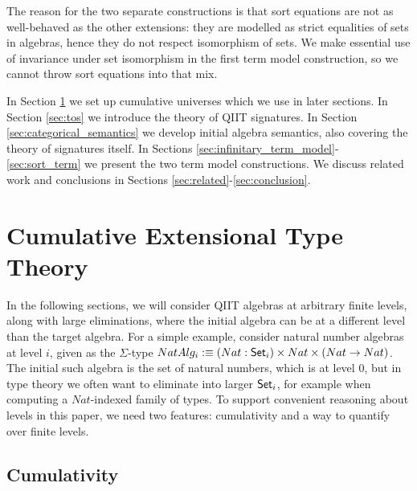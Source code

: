 \documentclass{llncs}
\begin{document}
The reason for the two separate constructions is that sort equations are not as
well-behaved as the other extensions: they are modelled as strict equalities of
sets in algebras, hence they do not respect isomorphism of sets. We make
essential use of invariance under set isomorphism in the first term model
construction, so we cannot throw sort equations into that mix.

In Section \ref{sec:levels} we set up cumulative universes which we use in later
sections. In Section \ref{sec:tos} we introduce the theory of QIIT
signatures. In Section \ref{sec:categorical_semantics} we develop initial algebra semantics,
also covering the theory of signatures itself. In Sections
\ref{sec:infinitary_term_model}-\ref{sec:sort_term} we present the two term model
constructions. We discuss related work and conclusions in Sections
\ref{sec:related}-\ref{sec:conclusion}.


\section{Cumulative Extensional Type Theory}
\label{sec:levels}

In the following sections, we will consider QIIT algebras at arbitrary finite
levels, along with large eliminations, where the initial algebra can be at a
different level than the target algebra. For a simple example, consider natural
number algebras at level $i$, given as the $\Sigma$-type $NatAlg_i :\equiv(Nat :
\mathsf{Set}_i)\times Nat\times(Nat \rightarrow Nat)$. The initial such algebra is the set of
natural numbers, which is at level $0$, but in type theory we often want to
eliminate into larger $\mathsf{Set}_i$, for example when computing a $Nat$-indexed
family of types. To support convenient reasoning about levels in this paper, we
need two features: cumulativity and a way to quantify over finite levels.


\subsection{Cumulativity}
\end{document}
